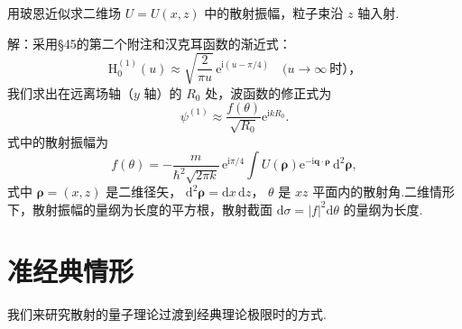 \begin{xiti}
\quad 用玻恩近似求二维场 $U=U(x,z)$ 中的散射振幅，粒子束沿 $z$ 轴入射.

解：采用§45的第二个附注和汉克耳函数的渐近式：
\begin{equation*}
  \mathrm{H}_0^{(1)}(u)\approx\sqrt{\frac{2}{\pi u}}\,
  \mathrm{e}^{\mathrm{i}(u-\pi/4)}
  \quad(u\to\infty\ \text{时），}
\end{equation*}
我们求出在远离场轴（$y$ 轴）的 $R_0$ 处，波函数的修正式为
\begin{equation*}
  \psi^{(1)}\approx\frac{f(\theta)}{\sqrt{R_0}}\mathrm{e}^{\mathrm{i}kR_0}.
\end{equation*}
式中的散射振幅为
\begin{equation*}
  f(\theta)=-\frac{m}{\hbar^2\sqrt{2\pi k}}\,
  \mathrm{e}^{\mathrm{i}\pi/4}
  \int U(\boldsymbol{\rho})
  \mathrm{e}^{-\mathrm{i}\boldsymbol{q}\cdot\boldsymbol{\rho}}\,
  \mathrm{d}^2\boldsymbol{\rho},
\end{equation*}
式中 $\boldsymbol{\rho}=(x,z)$ 是二维径矢，
$\mathrm{d}^2\boldsymbol{\rho}=\mathrm{d}x\,\mathrm{d}z$，
$\theta$ 是 $xz$ 平面内的散射角.二维情形下，散射振幅的量纲为长度的平方根，散射截面 $\mathrm{d}\sigma=|f|^2\mathrm{d}\theta$ 的量纲为长度.

\end{xiti}
\setcounter{equation}{0}%

\section{准经典情形}

我们来研究散射的量子理论过渡到经典理论极限时的方式.

